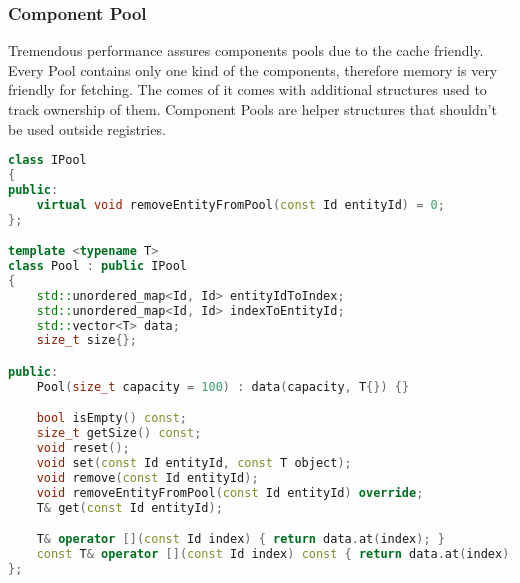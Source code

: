 \newpage

\subsubsection{Component Pool}
Tremendous performance assures components pools due to the cache friendly.
Every Pool contains only one kind of the components, therefore memory is very friendly for fetching. The comes of it comes with additional structures used to track ownership of them.
Component Pools are helper structures that shouldn't be used outside registries.
\begin{lstlisting}[language=c++, caption=Components Pool class]
class IPool
{
public:
    virtual void removeEntityFromPool(const Id entityId) = 0;
};

template <typename T>
class Pool : public IPool
{
    std::unordered_map<Id, Id> entityIdToIndex;
    std::unordered_map<Id, Id> indexToEntityId;
    std::vector<T> data;
    size_t size{};

public:
    Pool(size_t capacity = 100) : data(capacity, T{}) {}

    bool isEmpty() const;
    size_t getSize() const;
    void reset();
    void set(const Id entityId, const T object);
    void remove(const Id entityId);
    void removeEntityFromPool(const Id entityId) override;
    T& get(const Id entityId);

    T& operator [](const Id index) { return data.at(index); }
    const T& operator [](const Id index) const { return data.at(index); }
};
\end{lstlisting}

\newpage

